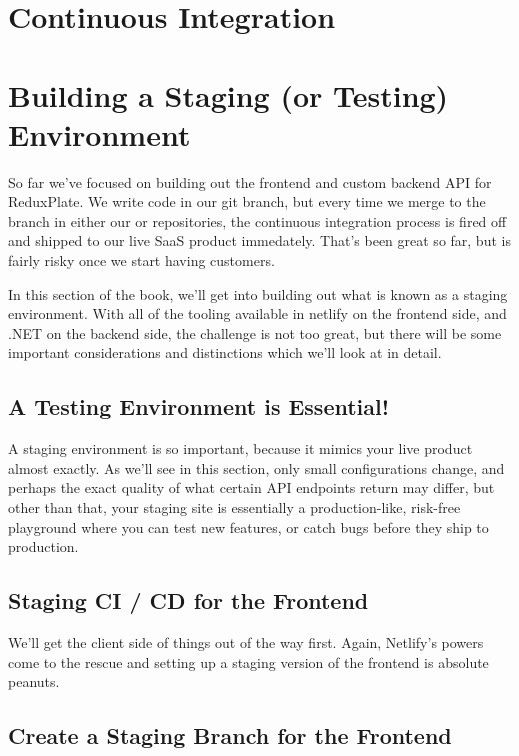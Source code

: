 \documentclass[a4paper,
                             oneside,
                             BCOR1.0cm,
                             DIV11,
                             parskip=full,
                             11pt]{scrbook}
\begin{document}
\chapter{Continuous Integration}\label{cap:primer}


\chapter{Building a Staging (or Testing) Environment}\label{cap:primer}


So far we've focused on building out the frontend and custom backend API for ReduxPlate. We write code in our  git branch, but every time we merge to the  branch in either our  or  repositories, the continuous integration process is fired off and shipped to our live SaaS product immedately. That's been great so far, but is fairly risky once we start having customers.

In this section of the book, we'll get into building out what is known as a staging environment. With all of the tooling available in netlify on the frontend side, and .NET on the backend side, the challenge is not too great, but there will be some important considerations and distinctions which we'll look at in detail.

\section{A Testing Environment is Essential!}\label{sec:titles}

A staging environment is so important, because it mimics your live product almost exactly. As we'll see in this section, only small configurations change, and perhaps the exact quality of what certain API endpoints return may differ, but other than that, your staging site is essentially a production-like, risk-free playground where you can test new features, or catch bugs before they ship to production.

\section{Staging CI / CD for the Frontend}\label{sec:titles}

We'll get the client side of things out of the way first. Again, Netlify's powers come to the rescue and setting up a staging version of the frontend is absolute peanuts. 

\section{Create a Staging Branch for the Frontend}\label{sec:titles}
\end{document}
